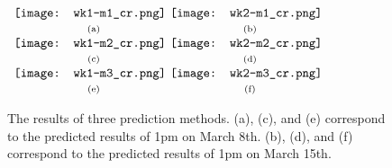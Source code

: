 \begin{figure}[t]
\begin{center}
$\begin{array}{c@{\hspace{0.01\linewidth}}c}
\texttt{[image: wk1-m1\_cr.png]} &
\texttt{[image: wk2-m1\_cr.png]}
\\
\mbox{\small{(a)}} & \mbox{\small{(b)}}
\\
\texttt{[image: wk1-m2\_cr.png]} &
\texttt{[image: wk2-m2\_cr.png]}
\\
\mbox{\small{(c)}} & \mbox{\small{(d)}}
\\
\texttt{[image: wk1-m3\_cr.png]} &
\texttt{[image: wk2-m3\_cr.png]}
\\
\mbox{\small{(e)}} & \mbox{\small{(f)}}
\end{array}$
\end{center}
\vspace{-.1in}
\caption{The results of three prediction methods. (a), (c), and (e) correspond to the predicted results of 1pm on March 8th. (b), (d), and (f) correspond to the predicted results of 1pm on March 15th.}
\label{fig:predict}
\end{figure}

\begin{table}[t]
\caption{The percentage errors of three prediction methods.}
\begin{center}
\end{center}
\vspace{-.2in}
\label{tab:err}
\end{table}



